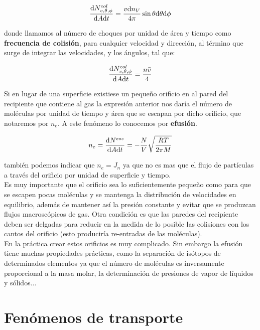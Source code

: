\documentclass[12pt]{book}
\begin{document}
\begin{equation}
\dfrac{\mathrm{d} N^{col}_{v,\theta,\phi}}{\mathrm{d} A \mathrm{d} t} = \dfrac{v \mathrm{d} n_V}{4 \pi} \sin \theta \mathrm{d} \theta \mathrm{d} \phi
\end{equation} 

donde llamamos al número de choques por unidad de área y tiempo como \textbf{frecuencia de colisión}, para cualquier velocidad y dirección, al término que surge de integrar las velocidades, y los ángulos, tal que:

\begin{equation}
\dfrac{\mathrm{d} N^{col}_{v,\theta,\phi}}{\mathrm{d} A \mathrm{d} t} = \dfrac{n \bar{v}}{4}
\end{equation}

Si en lugar de una superficie existiese un pequeño orificio en al pared del recipiente que contiene al gas la expresión anterior nos daría el número de moléculas por unidad de tiempo y área que se escapan por dicho orificio, que notaremos por $n_e$. A este fenómeno lo conocemos por \textbf{efusión}. 

\begin{equation}
n_e = \dfrac{\mathrm{d} N^{esc}}{\mathrm{d} A \mathrm{d} t } = - \dfrac{N}{V} \sqrt{\dfrac{RT}{2 \pi M}}
\end{equation}

también podemos indicar que $n_e = J_n$ ya que no es mas que el flujo de partículas a través del orificio por unidad de superficie y tiempo. \\

Es muy importante que el orificio sea lo suficientemente pequeño como para que se escapen pocas moléculas y se mantenga la distribución de velocidades en equilibrio, además de mantener así la presión constante y evitar que se produzcan flujos macroscópicos de gas. Otra condición es que las paredes del recipiente deben ser delgadas para reducir en la medida de lo posible las colisiones con los cantos del orificio (esto produciría re-entradas de las moléculas). \\

En la práctica crear estos orificios es muy complicado.  Sin embargo la efusión tiene muchas propiedades prácticas, como la separación de isótopos de determinados elementos ya que el número de moléculas es inversamente proporcional a la masa molar, la determinación de presiones de vapor de líquidos y sólidos... 

\chapter{Fenómenos de transporte}
\end{document}
